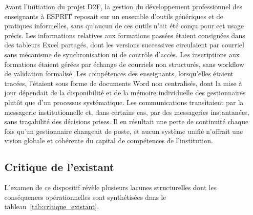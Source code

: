 \documentclass[12pt,a4paper]{report}
\begin{document}
Avant l'initiation du projet D2F, la gestion du développement professionnel des
enseignants à ESPRIT reposait sur un ensemble d'outils génériques et de pratiques
informelles, sans qu'aucun de ces outils n'ait été conçu pour cet usage précis.
Les informations relatives aux formations passées étaient consignées dans des
tableurs Excel partagés, dont les versions successives circulaient par courriel
sans mécanisme de synchronisation ni de contrôle d'accès. Les inscriptions aux
formations étaient gérées par échange de courriels non structurés, sans workflow
de validation formalisé. Les compétences des enseignants, lorsqu'elles étaient
tracées, l'étaient sous forme de documents Word non centralisés, dont la mise à
jour dépendait de la disponibilité et de la mémoire individuelle des
gestionnaires plutôt que d'un processus systématique. Les communications
transitaient par la messagerie institutionnelle et, dans certains cas, par des
messageries instantanées, sans traçabilité des décisions prises. Il en résultait
une perte de continuité chaque fois qu'un gestionnaire changeait de poste, et
aucun système unifié n'offrait une vision globale et cohérente du capital de
compétences de l'institution.

\subsection{Critique de l'existant}

L'examen de ce dispositif révèle plusieurs lacunes structurelles dont les
conséquences opérationnelles sont synthétisées dans le tableau~\ref{tab:critique_existant}.
\end{document}
